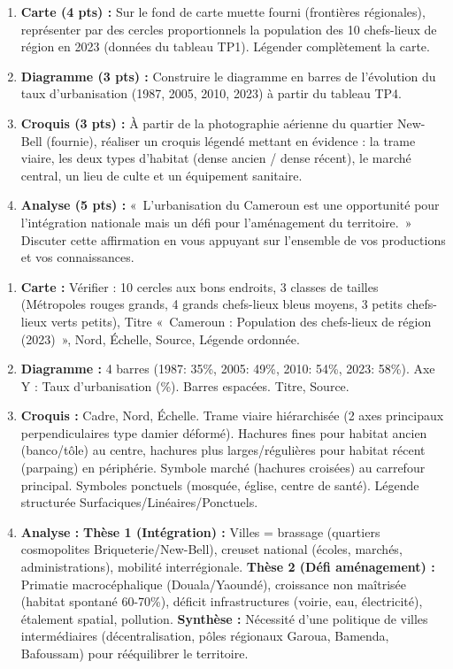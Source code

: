 \documentclass[11pt]{article}
\begin{document}
\begin{exercice}
\begin{enumerate}
    \item \textbf{Carte (4 pts) :} Sur le fond de carte muette fourni (frontières régionales), représenter par des cercles proportionnels la population des 10 chefs-lieux de région en 2023 (données du tableau TP1). Légender complètement la carte.
    \item \textbf{Diagramme (3 pts) :} Construire le diagramme en barres de l'évolution du taux d'urbanisation (1987, 2005, 2010, 2023) à partir du tableau TP4.
    \item \textbf{Croquis (3 pts) :} À partir de la photographie aérienne du quartier New-Bell (fournie), réaliser un croquis légendé mettant en évidence : la trame viaire, les deux types d'habitat (dense ancien / dense récent), le marché central, un lieu de culte et un équipement sanitaire.
    \item \textbf{Analyse (5 pts) :} «~L'urbanisation du Cameroun est une opportunité pour l'intégration nationale mais un défi pour l'aménagement du territoire.~» Discuter cette affirmation en vous appuyant sur l'ensemble de vos productions et vos connaissances.
\end{enumerate}
\end{exercice}

\begin{corrige}
\begin{enumerate}
    \item \textbf{Carte :} Vérifier : 10 cercles aux bons endroits, 3 classes de tailles (Métropoles rouges grands, 4 grands chefs-lieux bleus moyens, 3 petits chefs-lieux verts petits), Titre «~Cameroun : Population des chefs-lieux de région (2023)~», Nord, Échelle, Source, Légende ordonnée.
    \item \textbf{Diagramme :} 4 barres (1987: 35\%, 2005: 49\%, 2010: 54\%, 2023: 58\%). Axe Y : Taux d'urbanisation (\%). Barres espacées. Titre, Source.
    \item \textbf{Croquis :} Cadre, Nord, Échelle. Trame viaire hiérarchisée (2 axes principaux perpendiculaires type damier déformé). Hachures fines pour habitat ancien (banco/tôle) au centre, hachures plus larges/régulières pour habitat récent (parpaing) en périphérie. Symbole marché (hachures croisées) au carrefour principal. Symboles ponctuels (mosquée, église, centre de santé). Légende structurée Surfaciques/Linéaires/Ponctuels.
    \item \textbf{Analyse :} 
    \textbf{Thèse 1 (Intégration) :} Villes = brassage (quartiers cosmopolites Briqueterie/New-Bell), creuset national (écoles, marchés, administrations), mobilité interrégionale.
    \textbf{Thèse 2 (Défi aménagement) :} Primatie macrocéphalique (Douala/Yaoundé), croissance non maîtrisée (habitat spontané 60-70\%), déficit infrastructures (voirie, eau, électricité), étalement spatial, pollution.
    \textbf{Synthèse :} Nécessité d'une politique de villes intermédiaires (décentralisation, pôles régionaux Garoua, Bamenda, Bafoussam) pour rééquilibrer le territoire.
\end{enumerate}
\end{corrige}
\end{document}
